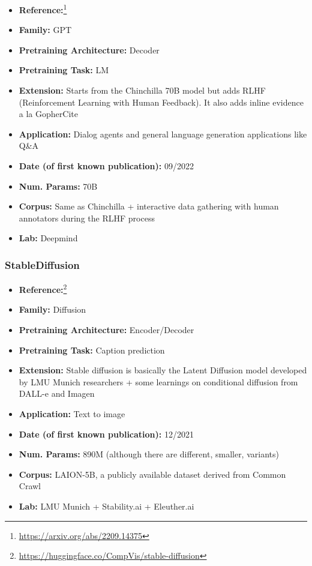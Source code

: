 \documentclass{article}
\begin{document}
            \begin{itemize}
                \item \textbf{Reference:}\footnote{\url{https://arxiv.org/abs/2209.14375}}\cite{glaese2022improving}
                \item \textbf{Family:} GPT 
                \item \textbf{Pretraining Architecture:} Decoder
                \item \textbf{Pretraining Task:} LM
                \item \textbf{Extension:} Starts from the Chinchilla 70B model but adds RLHF (Reinforcement Learning with Human Feedback). It also adds inline evidence a la GopherCite  
                \item \textbf{Application:} Dialog agents and general language generation applications like Q\&A
                \item \textbf{Date (of first known publication):} 09/2022
                \item \textbf{Num. Params:} 70B
                \item \textbf{Corpus:} Same as Chinchilla + interactive data gathering with human annotators during the RLHF process
                \item \textbf{Lab:} Deepmind
            \end{itemize}
 
\subsubsection{StableDiffusion}

            \begin{itemize}
                \item \textbf{Reference:}\footnote{\url{https://huggingface.co/CompVis/stable-diffusion}}\cite{rombach2022high}
                \item \textbf{Family:} Diffusion 
                \item \textbf{Pretraining Architecture:} Encoder/Decoder
                \item \textbf{Pretraining Task:} Caption prediction
                \item \textbf{Extension:} Stable diffusion is basically the Latent Diffusion model developed by LMU Munich researchers + some learnings on conditional diffusion from DALL-e and Imagen  
                \item \textbf{Application:} Text to image 
                \item \textbf{Date (of first known publication):} 12/2021
                \item \textbf{Num. Params:} 890M (although there are different, smaller, variants)
                \item \textbf{Corpus:} LAION-5B, a publicly available dataset derived from Common Crawl
                \item \textbf{Lab:} LMU Munich + Stability.ai + Eleuther.ai
            \end{itemize}
\end{document}
